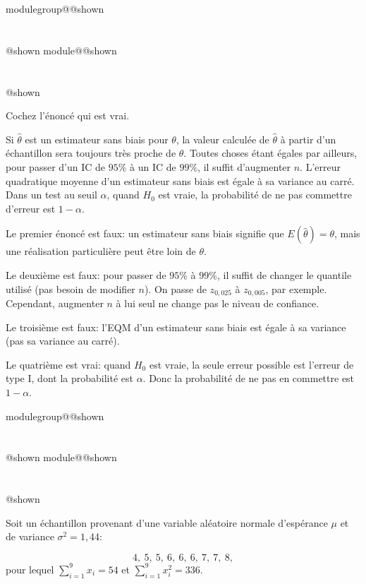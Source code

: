 \documentclass{Evaluation}
\makeatletter
\newcommand{\currentmodulekey}{}
\newcommand{\currentmoduletitle}{}
\newcommand{\currentgroupkey}{}
\newcommand{\currentgrouptitle}{}
\newcommand{\showmoduleifneeded}{%
  \ifx\currentgroupkey\empty\else
    \expandafter\ifx\csname modulegroup@\currentgroupkey @shown\endcsname\relax
      \section*{\currentgrouptitle}%
      \expandafter\gdef\csname modulegroup@\currentgroupkey @shown\endcsname{1}%
    \fi
  \fi
  \expandafter\ifx\csname module@\currentmodulekey @shown\endcsname\relax
    \section*{\currentmoduletitle}%
    \expandafter\gdef\csname module@\currentmodulekey @shown\endcsname{1}%
  \fi
}
\newenvironment{A25}{\showmoduleifneeded}{}
\makeatother
\begin{document}
\begin{questions}
\begin{A25}
\question Cochez l'énoncé qui est vrai.

\begin{checkboxes}
    \choice Si $\hat{\theta}$ est un estimateur sans biais pour $\theta$, la valeur calculée de $\hat{\theta}$ à partir d'un échantillon sera toujours très proche de $\theta$.
    \choice Toutes choses étant égales par ailleurs, pour passer d'un IC de $95\%$ à un IC de $99\%$, il suffit d'augmenter $n$.
    \choice L'erreur quadratique moyenne d'un estimateur sans biais est égale à sa variance au carré.
    \correctchoice Dans un test au seuil $\alpha$, quand $H_0$ est vraie, la probabilité de ne pas commettre d'erreur est $1-\alpha$.
\end{checkboxes}

\begin{solution}
    Le premier énoncé est faux: un estimateur sans biais signifie que $E(\hat{\theta}) = \theta$, mais une réalisation particulière peut être loin de $\theta$.

    Le deuxième est faux: pour passer de $95\%$ à $99\%$, il suffit de changer le quantile utilisé (pas besoin de modifier $n$). On passe de $z_{0{,}025}$ à $z_{0{,}005}$, par exemple. Cependant, augmenter $n$ à lui seul ne change pas le niveau de confiance.

    Le troisième est faux: l'EQM d'un estimateur sans biais est égale à sa variance (pas sa variance au carré).

    Le quatrième est vrai: quand $H_0$ est vraie, la seule erreur possible est l'erreur de type I, dont la probabilité est $\alpha$. Donc la probabilité de ne pas en commettre est $1-\alpha$.
\end{solution}
\end{A25}

\begin{A25}
\question Soit un échantillon provenant d'une variable aléatoire normale d'espérance $\mu$ et de variance $\sigma^2=1{,}44$:

$$4,~5,~5,~6,~6,~6,~7,~7,~8,$$
pour lequel $\displaystyle\sum_{i=1}^{9}x_i=54$ et $\displaystyle\sum_{i=1}^{9}x_i^2=336$.

\end{A25}
\end{questions}
\end{document}
